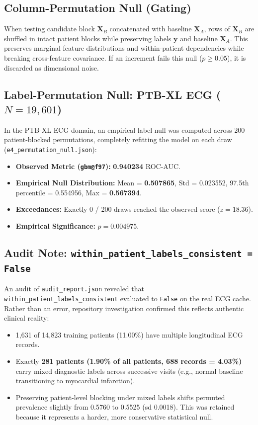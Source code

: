 \documentclass[11pt,a4paper]{report}
\newcommand{\artifact}[1]{\nolinkurl{#1}}
\begin{document}
\subsection{Column-Permutation Null (Gating)}
When testing candidate block $\mathbf{X}_B$ concatenated with baseline $\mathbf{X}_A$, rows of $\mathbf{X}_B$ are shuffled in intact patient blocks while preserving labels $\mathbf{y}$ and baseline $\mathbf{X}_A$. This preserves marginal feature distributions and within-patient dependencies while breaking cross-feature covariance. If an increment fails this null ($p \ge 0.05$), it is discarded as dimensional noise.

\subsection{Label-Permutation Null: PTB-XL ECG ($N=19,601$)}
In the PTB-XL ECG domain, an empirical label null was computed across 200 patient-blocked permutations, completely refitting the model on each draw (\artifact{e4\_permutation\_null.json}):
\begin{itemize}
  \item \textbf{Observed Metric (\texttt{gbm@f97}):} \textbf{0.940234} ROC-AUC.
  \item \textbf{Empirical Null Distribution:} Mean = \textbf{0.507865}, Std = 0.023552, 97.5th percentile = 0.554956, Max = \textbf{0.567394}.
  \item \textbf{Exceedances:} Exactly 0 / 200 draws reached the observed score ($z = 18.36$).
  \item \textbf{Empirical Significance:} \textbf{$p = 0.004975$}.
\end{itemize}

\subsection{Audit Note: \texttt{within\_patient\_labels\_consistent = False}}
An audit of \artifact{audit\_report.json} revealed that \texttt{within\_patient\_labels\_consistent} evaluated to \texttt{False} on the real ECG cache. Rather than an error, repository investigation confirmed this reflects authentic clinical reality:
\begin{itemize}
  \item 1,631 of 14,823 training patients (11.00\%) have multiple longitudinal ECG records.
  \item Exactly \textbf{281 patients (1.90\% of all patients, 688 records = 4.03\%)} carry mixed diagnostic labels across successive visits (e.g., normal baseline transitioning to myocardial infarction).
  \item Preserving patient-level blocking under mixed labels shifts permuted prevalence slightly from 0.5760 to 0.5525 (sd 0.0018). This was retained because it represents a harder, more conservative statistical null.
\end{itemize}
\end{document}
